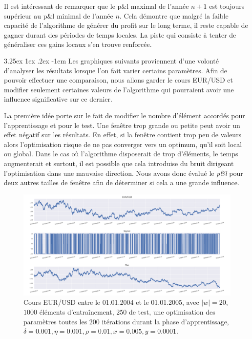 \documentclass[a4paper, 11pt]{article}
\makeatletter
\renewcommand\paragraph{\@startsection{paragraph}{5}{\z@}%
  {3.25ex \@plus1ex \@minus.2ex}%
  {-1em}%
  {\normalfont\normalsize\bfseries}}
\makeatother
\begin{document}
Il est intéressant de remarquer que le p\&l maximal de l'année $n+1$ est toujours supérieur au p\&l minimal de l'année $n$. Cela démontre que malgré la faible capacité de l'algorithme de générer du profit sur le long terme, il reste capable de gagner durant des périodes de temps locales. La piste qui consiste à tenter de généraliser ces gains locaux s'en trouve renforcée.

\paragraph{}
Les graphiques suivants proviennent d'une volonté d'analyser les résultats lorsque l'on fait varier certains paramètres. Afin de pouvoir effectuer une comparaison, nous allons garder le cours EUR/USD et modifier seulement certaines valeurs de l'algorithme qui pourraient avoir une influence significative sur ce dernier.

La première idée porte sur le fait de modifier le nombre d'élément accordés pour l'apprentissage et pour le test. Une fenêtre trop grande ou petite peut avoir un effet négatif sur les résultats. En effet, si la fenêtre contient trop peu de valeurs alors l'optimisation risque de ne pas converger vers un optimum, qu'il soit local ou global. Dans le cas où l'algorithme disposerait de trop d'éléments, le temps augmenterait et surtout, il est possible que cela introduise du bruit dirigeant l'optimisation dans une mauvaise direction. Nous avons donc évalué le \textit{p\&l} pour deux autres tailles de fenêtre afin de déterminer si cela a une grande influence.

\begin{figure}
	\centering
	\includegraphics[scale=0.5]{res/eursud_2004-2005_size_1000-250}
	\caption{Cours EUR/USD entre le 01.01.2004 et le 01.01.2005, avec $|w| = 20$, $1000$ éléments d'entraînement, $250$ de test, une optimisation des
		paramètres toutes les $200$ itérations durant la phase d'apprentissage, $\delta = 0.001, \eta=0.001,\rho=0.01, x = 0.005, y=0.0001$.}
\end{figure}
\end{document}
